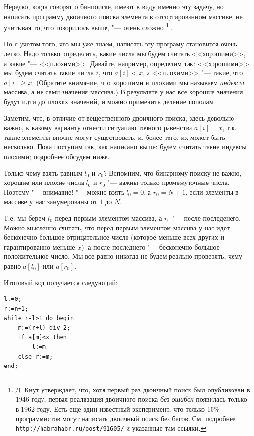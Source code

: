 \documentclass[a4paper,10pt]{problems}
\begin{document}
Нередко, когда говорят о бинпоиске, имеют в виду именно эту задачу, но написать программу
двоичного поиска элемента в отсортированном массиве, не учитывая то, что говорилось выше,
"--- очень сложно%
\footnote{Д. Кнут утверждает, что, хотя первый раз двоичный поиск был опубликован в 1946 году,
первая реализация двоичного поиска \textit{без ошибок} появилась только в 1962 году. 
Есть еще один известный эксперимент, что только 10\% программистов могут написать двоичный поиск без багов.
См. подробнее \texttt{http://habrahabr.ru/post/91605/} и указанные там ссылки.}%
.

Но с учетом того, что мы уже знаем, написать эту програму становится очень легко. 
Надо только определить, какие числа мы будем считать <<хорошими>>, а какие "--- <<плохими>>.
Давайте, например, определим так: <<хорошими>> мы будем считать такие числа $i$, что $a[i]<x$,
а <<плохими>> "--- такие, что $a[i]\geq x$. 
(Обратите внимание, что хорошими и плохими мы называем \textit{индексы} массива, а не сами значения массива.)
В результате у нас все хорошие значения будут идти до плохих значений, и можно применить деление пополам.

Заметим, что, в отличие от вещественного двоичного поиска, здесь довольно важно, к какому варианту 
отнести ситуацию точного равенства $a[i]=x$, т.к. такие элементы вполне могут существовать,
и, более того, их может быть несколько.
Пока поступим так, как написано выше: будем считать такие индексы плохими;
подробнее обсудим ниже.

Только чему взять равным $l_0$ и $r_0$?
Вспомним, что бинарному поиску не важно, хорошие или плохие числа $l_0$ и $r_0$ "---
важны только промежуточные числа. 
Поэтому "--- внимание! "--- можно взять $l_0=0$, а $r_0=N+1$, если элементы в массиве
у нас занумерованы от $1$ до $N$. 

Т.е. мы берем $l_0$ перед первым элементом массива, а $r_0$ "--- после последенего.
Можно мысленно считать, что перед первым элементом массива у нас идет бесконечно большое отрицательное число
(которое меньше всех других и гарантированно меньше $x$), а после последнего "---
бесконечно большое положительное число.
Мы все равно никогда не будем реально проверять, чему равно $a[l_0]$ или $a[r_0]$.

Итоговый код получается следующий:
\begin{codesampleo}\begin{verbatim}
l:=0;
r:=n+1;  
while r-l>1 do begin    
    m:=(r+l) div 2;
    if a[m]<x then
        l:=m
    else r:=m;
end;
\end{verbatim}
\end{codesampleo}
\end{document}
